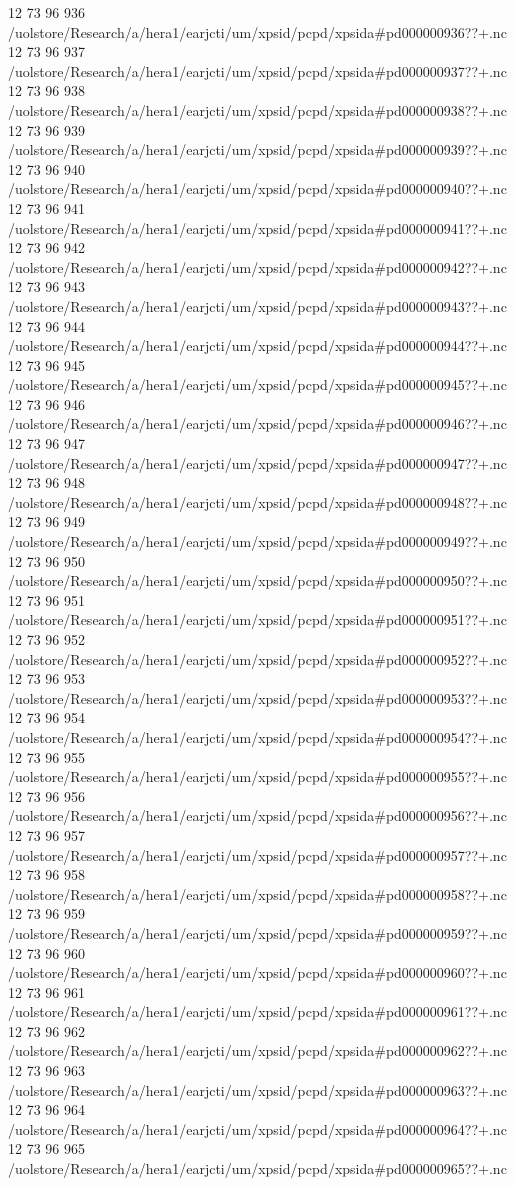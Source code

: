 12 73 96
936
/uolstore/Research/a/hera1/earjcti/um/xpsid/pcpd/xpsida#pd000000936??+.nc
12 73 96
937
/uolstore/Research/a/hera1/earjcti/um/xpsid/pcpd/xpsida#pd000000937??+.nc
12 73 96
938
/uolstore/Research/a/hera1/earjcti/um/xpsid/pcpd/xpsida#pd000000938??+.nc
12 73 96
939
/uolstore/Research/a/hera1/earjcti/um/xpsid/pcpd/xpsida#pd000000939??+.nc
12 73 96
940
/uolstore/Research/a/hera1/earjcti/um/xpsid/pcpd/xpsida#pd000000940??+.nc
12 73 96
941
/uolstore/Research/a/hera1/earjcti/um/xpsid/pcpd/xpsida#pd000000941??+.nc
12 73 96
942
/uolstore/Research/a/hera1/earjcti/um/xpsid/pcpd/xpsida#pd000000942??+.nc
12 73 96
943
/uolstore/Research/a/hera1/earjcti/um/xpsid/pcpd/xpsida#pd000000943??+.nc
12 73 96
944
/uolstore/Research/a/hera1/earjcti/um/xpsid/pcpd/xpsida#pd000000944??+.nc
12 73 96
945
/uolstore/Research/a/hera1/earjcti/um/xpsid/pcpd/xpsida#pd000000945??+.nc
12 73 96
946
/uolstore/Research/a/hera1/earjcti/um/xpsid/pcpd/xpsida#pd000000946??+.nc
12 73 96
947
/uolstore/Research/a/hera1/earjcti/um/xpsid/pcpd/xpsida#pd000000947??+.nc
12 73 96
948
/uolstore/Research/a/hera1/earjcti/um/xpsid/pcpd/xpsida#pd000000948??+.nc
12 73 96
949
/uolstore/Research/a/hera1/earjcti/um/xpsid/pcpd/xpsida#pd000000949??+.nc
12 73 96
950
/uolstore/Research/a/hera1/earjcti/um/xpsid/pcpd/xpsida#pd000000950??+.nc
12 73 96
951
/uolstore/Research/a/hera1/earjcti/um/xpsid/pcpd/xpsida#pd000000951??+.nc
12 73 96
952
/uolstore/Research/a/hera1/earjcti/um/xpsid/pcpd/xpsida#pd000000952??+.nc
12 73 96
953
/uolstore/Research/a/hera1/earjcti/um/xpsid/pcpd/xpsida#pd000000953??+.nc
12 73 96
954
/uolstore/Research/a/hera1/earjcti/um/xpsid/pcpd/xpsida#pd000000954??+.nc
12 73 96
955
/uolstore/Research/a/hera1/earjcti/um/xpsid/pcpd/xpsida#pd000000955??+.nc
12 73 96
956
/uolstore/Research/a/hera1/earjcti/um/xpsid/pcpd/xpsida#pd000000956??+.nc
12 73 96
957
/uolstore/Research/a/hera1/earjcti/um/xpsid/pcpd/xpsida#pd000000957??+.nc
12 73 96
958
/uolstore/Research/a/hera1/earjcti/um/xpsid/pcpd/xpsida#pd000000958??+.nc
12 73 96
959
/uolstore/Research/a/hera1/earjcti/um/xpsid/pcpd/xpsida#pd000000959??+.nc
12 73 96
960
/uolstore/Research/a/hera1/earjcti/um/xpsid/pcpd/xpsida#pd000000960??+.nc
12 73 96
961
/uolstore/Research/a/hera1/earjcti/um/xpsid/pcpd/xpsida#pd000000961??+.nc
12 73 96
962
/uolstore/Research/a/hera1/earjcti/um/xpsid/pcpd/xpsida#pd000000962??+.nc
12 73 96
963
/uolstore/Research/a/hera1/earjcti/um/xpsid/pcpd/xpsida#pd000000963??+.nc
12 73 96
964
/uolstore/Research/a/hera1/earjcti/um/xpsid/pcpd/xpsida#pd000000964??+.nc
12 73 96
965
/uolstore/Research/a/hera1/earjcti/um/xpsid/pcpd/xpsida#pd000000965??+.nc
